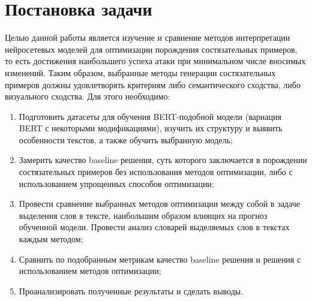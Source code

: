 \section{Постановка задачи}
\label{sec:Chapter1} 

\noindent\hspace{0.6cm}Целью данной работы является изучение и сравнение методов интерпретации нейросетевых моделей для оптимизации порождения состязательных примеров, то есть достижения наибольшего успеха атаки при минимальном числе вносимых изменений. Таким образом, выбранные методы генерации состязательных примеров должны удовлетворять критериям либо семантического сходства, либо визуального сходства. Для этого необходимо:

\begin{enumerate}
    \item Подготовить датасеты для обучения BERT-подобной модели (вариация BERT с некоторыми модификациями), изучить их структуру и выявить особенности текстов, а также обучить выбранную модель;
    \item Замерить качество baseline решения, суть которого заключается в порождении состязательных примеров без использования методов оптимизации, либо с использованием упрощенных способов оптимизации;
    \item Провести сравнение выбранных методов оптимизации между собой в задаче выделения слов в тексте, наибольшим образом влиящих на прогноз обученной модели. Провести анализ словарей выделяемых слов в текстах каждым методом;
    \item Сравнить по подобранным метрикам качество baseline решения и решения с использованием методов оптимизации;
    \item Проанализировать полученные результаты и сделать выводы.
\end{enumerate}